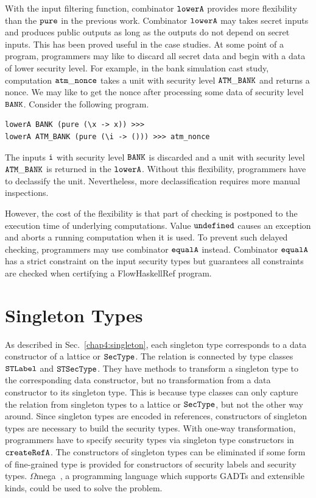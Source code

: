 \documentclass[a4paper]{report}
\newcommand{\co}[1]{$\cod{#1}$}
\begin{document}
With the input filtering function, combinator \co{lowerA} provides more flexibility than
the \co{pure} in the previous work. Combinator \co{lowerA} may takes secret inputs and produces
public outputs as long as the outputs do not depend on secret inputs. This has been proved
useful in the case studies. At some point of a program, programmers may like to discard all
secret data and begin with a data of lower security level. 
For example, in the bank simulation cast study, computation
\co{atm\_nonce} takes a unit with security level \co{ATM\_BANK} and returns a nonce. 
We may like to get the nonce after processing some data of security level \co{BANK}.
Consider the following program.
\begin{Verbatim}[fontsize=\footnotesize]
lowerA BANK (pure (\x -> x)) >>>
lowerA ATM_BANK (pure (\i -> ())) >>> atm_nonce
\end{Verbatim}
The inputs \co{i} with security level \co{BANK} is discarded and a unit with security level 
\co{ATM\_BANK} is returned in the \co{lowerA}. Without this flexibility, programmers have to
declassify the unit. Nevertheless, more declassification requires more manual inspections.

However, the cost of the flexibility is that part of checking is postponed to the execution time of
underlying computations. Value \co{undefined} causes an exception and aborts a running computation
when it is used. To prevent such delayed checking, programmers may use combinator \co{equalA} instead.
Combinator \co{equalA} has a strict constraint on the input security types but guarantees all constraints
are checked when certifying a FlowHaskellRef program.

\section{Singleton Types}
As described in Sec.~\ref{chap4:singleton}, each singleton type corresponds to a data constructor of
a lattice or \co{SecType}. The relation is connected by type classes \co{STLabel} and 
\co{STSecType}. 
They have methods to transform a singleton type to the corresponding data constructor, but no
transformation from a data constructor to its singleton type.
This is because type classes can only capture the relation from singleton types to a lattice or \co{SecType},
but not the other way around. 
Since singleton types are encoded in references, constructors of singleton types are necessary to build
the security types.
With one-way transformation, programmers have to specify security types via
singleton type constructors in \co{createRefA}.  
The constructors of singleton types can be eliminated if some form of fine-grained type is provided
for constructors of security labels and security types.
$\Omega$mega~\cite{Sheard05}, a programming language which supports GADTs and extensible kinds, could be used to solve 
the problem.
\end{document}
